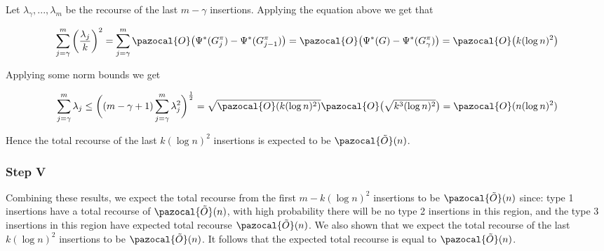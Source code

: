 \documentclass{article}
\begin{document}
Let $\lambda_{\gamma},...,\lambda_{m}$ be the recourse of the last $m - \gamma$ insertions. Applying the equation above we get that

\[\sum_{j=\gamma}^{m}\bigg(\frac{\lambda_{j}}{k}\bigg)^{2} = \sum_{j=\gamma}^{m} \pazocal{O}\big(\Psi^{*}(G_{j}^{\pi}) - \Psi^{*}(G_{j-1}^{\pi})\big)
= \pazocal{O}\big(\Psi^{*}(G) - \Psi^{*}(G_{\gamma}^{\pi})\big) = \pazocal{O}\big(k (\log n)^2\big)\]

Applying some norm bounds we get

\[\sum_{j=\gamma}^{m}\lambda_{j} \leq \bigg((m-\gamma+1)\sum_{j=\gamma}^{m}\lambda_{j}^{2}\bigg)^{\frac{1}{2}} = \sqrt{\pazocal{O}(k(\log n)^2)}\pazocal{O}\big(\sqrt{k^{3}(\log n)^2}\big) =\pazocal{O}(n(\log n)^2)\]

Hence the total recourse of the last $k(\log n)^2$ insertions is expected to be $\pazocal{\tilde{O}}(n)$.

\subsubsection{Step V}

Combining these results, we expect the total recourse from the first $m-k(\log n)^2$ insertions to be $\pazocal{\tilde{O}}(n)$ since: type 1 insertions have a total recourse of $\pazocal{\tilde{O}}(n)$, with high probability there will be no type 2 insertions in this region, and the type 3 insertions in this region have expected total recourse $\pazocal{\tilde{O}}(n)$. We also shown that we expect the total recourse of the last $k (\log n)^2$ insertions to be $\pazocal{\tilde{O}}(n)$. It follows that the expected total recourse is equal to $\pazocal{\tilde{O}}(n)$.
\end{document}
